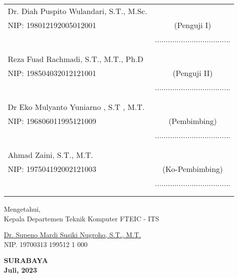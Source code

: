 \noindent
\begin{tabularx}{\textwidth}{X c}
  Dr. Diah Puspito Wulandari, S.T., M.Sc.    &                 \\
  NIP: 198012192005012001   & (Penguji I)    \\
  & ................................... \\
  &  \\
  &  \\
  Reza Fuad Rachmadi, S.T., M.T., Ph.D  &                 \\
  NIP: 198504032012121001   & (Penguji II) \\
  & ................................... \\
  &  \\
  &  \\
  Dr Eko Mulyanto Yuniarno , S.T , M.T.      &                 \\
  NIP: 196806011995121009   & (Pembimbing)    \\
  & ................................... \\
  &  \\
  &  \\
  Ahmad Zaini, S.T., M.T. &                 \\
  NIP: 197504192002121003   & (Ko-Pembimbing) \\
  & ................................... \\
  &  \\
  &  \\
\end{tabularx}
\endgroup


\begin{center}
  Mengetahui, \\
  Kepala Departemen Teknik Komputer FTEIC - ITS\\

  \vspace{8ex}

  \underline{Dr. Supeno Mardi Susiki Nugroho, S.T., M.T.} \\
  NIP. 19700313 199512 1 000
\end{center}
  
\begin{center}
  \textbf{SURABAYA\\Juli, 2023}
\end{center}
\endgroup

